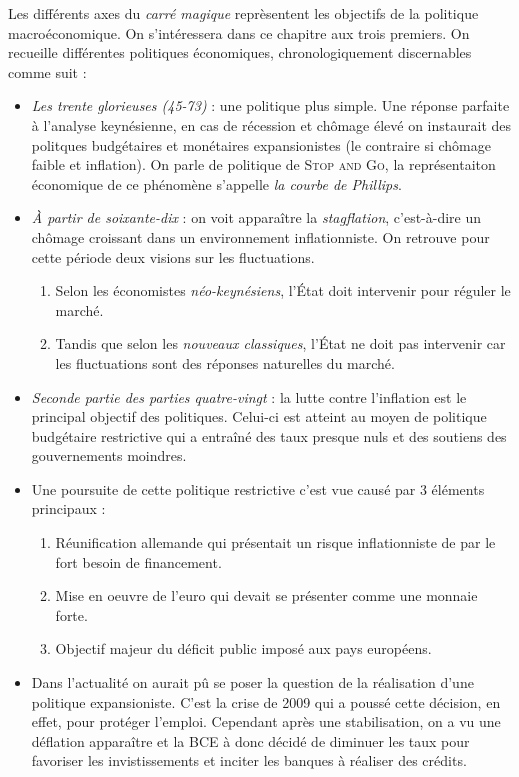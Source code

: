 Les différents axes du \emph{carré magique} reprèsentent les objectifs de la politique macroéconomique. 
On s'intéressera dans ce chapitre aux trois premiers. 
On recueille différentes politiques économiques, chronologiquement discernables comme suit : 
\begin{itemize}[label=]
	\item \emph{Les trente glorieuses (45-73)} : une politique plus simple. 
  Une réponse parfaite à l'analyse keynésienne, en cas de récession et chômage élevé
	on instaurait des politques budgétaires et monétaires expansionistes (le contraire si chômage faible
  et inflation). On parle de politique de \textsc{Stop and Go}, la représentaiton économique 
  de ce phénomène s'appelle \emph{la courbe de Phillips}.
	\item \emph{À partir de soixante-dix} : on voit apparaître la \emph{stagflation}, c'est-à-dire un
  chômage croissant dans un environnement inflationniste. On retrouve pour cette période deux visions
  sur les fluctuations.
  \begin{enumerate}
    \item Selon les économistes \emph{néo-keynésiens}, l'État doit intervenir pour réguler le marché.
    \item Tandis que selon les \emph{nouveaux classiques}, l'État ne doit pas intervenir car les fluctuations
    sont des réponses naturelles du marché.
  \end{enumerate}
  \item \emph{Seconde partie des parties quatre-vingt} : la lutte contre l'inflation est le principal
  objectif des politiques. Celui-ci est atteint au moyen de politique budgétaire restrictive
  qui a entraîné des taux presque nuls et des soutiens des gouvernements moindres.
  \item Une poursuite de cette politique restrictive c'est vue causé par 3 éléments principaux : 
  \begin{enumerate}
  	\item Réunification allemande qui présentait un risque inflationniste de par le fort besoin de financement.
  	\item Mise en oeuvre de l'euro qui devait se présenter comme une monnaie forte.
  	\item Objectif majeur du déficit public imposé aux pays européens.
  \end{enumerate}
  \item Dans l'actualité on aurait pû se poser la question de la réalisation d'une politique expansioniste. C'est la crise de 2009 qui a poussé cette décision,
  en effet, pour protéger l'emploi. Cependant après une stabilisation, on a vu une déflation apparaître et la BCE à donc décidé de diminuer les taux pour 
  favoriser les invistissements et inciter les banques à réaliser des crédits.
\end{itemize}

